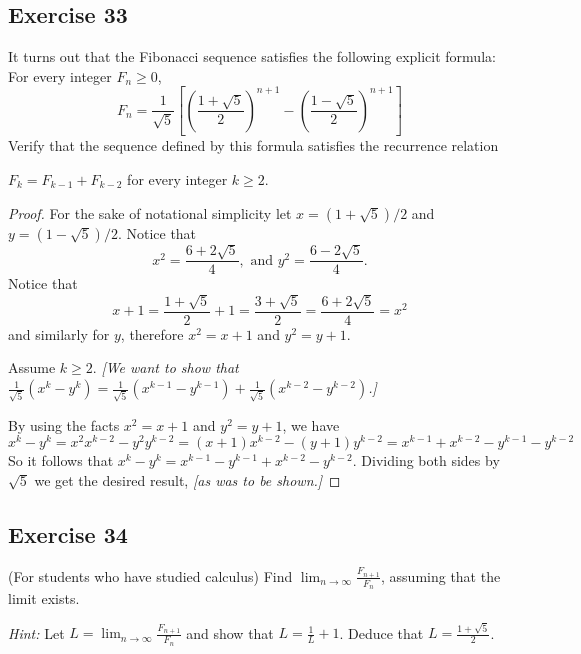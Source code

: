 \documentclass[14pt]{extarticle}
\newcommand{\dps}{\displaystyle}
\begin{document}
\subsection{Exercise 33}
It turns out that the Fibonacci sequence satisfies the following explicit formula: For every integer $F_n \geq 0$,
\[
    F_n = \frac{1}{\sqrt{5}}\left[\left(\frac{1 + \sqrt{5}}{2}\right)^{n+1} - \left(\frac{1 - \sqrt{5}}{2}\right)^{n+1}\right]
\]
Verify that the sequence defined by this formula satisfies the recurrence relation

\(F_k = F_{k - 1} + F_{k - 2}\) for every integer $k \geq 2$.

\begin{proof}
    For the sake of notational simplicity let \(x = (1 + \sqrt{5}) / 2\) and \(y = (1 - \sqrt{5}) / 2\). Notice that
    \[
        x^2 = \frac{6 + 2\sqrt{5}}{4}, \text{ and } y^2 = \frac{6 - 2\sqrt{5}}{4}.
    \]
    Notice that
    \[
        x + 1 = \frac{1 + \sqrt{5}}{2} + 1 = \frac{3 + \sqrt{5}}{2} = \frac{6 + 2\sqrt{5}}{4} = x^2
    \]
    and similarly for \(y\), therefore \(x^2 = x+1\) and \(y^2 = y+1\).

    Assume $k \geq 2$. {\it [We want to show that \(\dps \frac{1}{\sqrt{5}}(x^k - y^k) = \frac{1}{\sqrt{5}}(x^{k-1} - y^{k-1}) + \frac{1}{\sqrt{5}}(x^{k-2} - y^{k-2})\).]}

    By using the facts \(x^2 = x+1\) and \(y^2 = y+1\), we have
    \[
        x^k - y^k = x^2x^{k-2} - y^2y^{k-2} = (x+1)x^{k-2} - (y+1)y^{k-2} = x^{k-1} + x^{k-2} - y^{k-1} - y^{k-2}
    \]
    So it follows that \(x^k - y^k = x^{k-1} - y^{k-1} + x^{k-2} - y^{k-2}.\) Dividing both sides by \(\sqrt{5}\)
    we get the desired result, {\it [as was to be shown.]}
\end{proof}

\subsection{Exercise 34}
(For students who have studied calculus) Find \(\dps \lim_{n \to \infty} \frac{F_{n+1}}{F_n}\),
assuming that the limit exists.

    {\it Hint:} Let \(\dps L = \lim_{n \to \infty} \frac{F_{n+1}}{F_n}\) and show that \(\dps L = \frac{1}{L}
+ 1\). Deduce that \(\dps L = \frac{1 + \sqrt{5}}{2}\).
\end{document}
